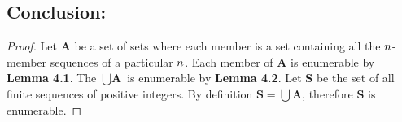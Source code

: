 \documentclass[a4paper,11pt]{article}
\begin{document}
	\bigskip

	\subsection*{Conclusion:}	
	\begin{proof}
	Let \textbf{A} be a set of sets where each member is a set containing all the $\mathnormal{n}$-member 
	sequences of a particular $\mathnormal{n}$. Each member of \textbf{A} is enumerable by \textbf{Lemma 
	4.1}. The $\bigcup \textbf{A}$ is enumerable by \textbf{Lemma 4.2}. Let \textbf{S} be the set of all finite
	sequences of positive integers. By definition $\textbf{S} = \bigcup \textbf{A}$, therefore \textbf{S} is 
	enumerable.
	\end{proof}
\end{document}
